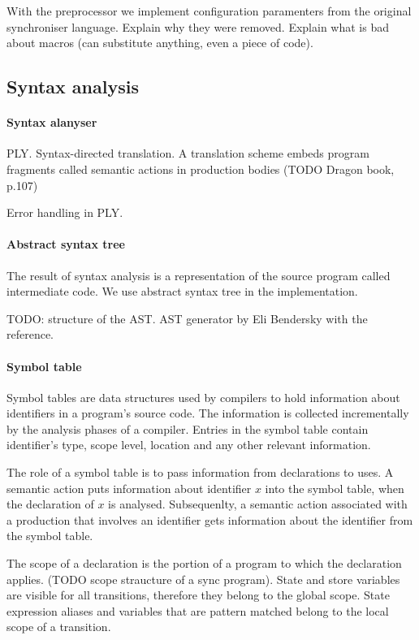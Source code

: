 With the preprocessor we implement configuration paramenters from the original synchroniser language. Explain why they were removed. Explain what is bad about macros (can substitute anything, even a piece of code).

\subsection{Syntax analysis}
  \paragraph{Syntax alanyser} PLY. Syntax-directed translation. A translation scheme embeds program fragments called semantic actions in production bodies (TODO Dragon book, p.107)

Error handling in PLY.


  \paragraph{Abstract syntax tree} The result of syntax analysis is a representation of the source program called intermediate code. We use abstract syntax tree in the implementation.

TODO: structure of the AST.
AST generator by Eli Bendersky with the reference.

  \paragraph{Symbol table}
Symbol tables are data structures used by compilers to hold information about identifiers in a program's source code. The information is collected incrementally by the analysis phases of a compiler. Entries in the symbol table contain identifier's type, scope level, location and any other relevant information.

The role of a symbol table is to pass information from declarations to uses. A semantic action puts information about identifier $x$ into the symbol table, when the declaration of $x$ is analysed. Subsequenlty, a semantic action associated with a production that involves an identifier gets information about the identifier from the symbol table.

The scope of a declaration is the portion of a program to which the declaration applies. (TODO scope straucture of a sync program). State and store variables are visible for all transitions, therefore they belong to the global scope. State expression aliases and variables that are pattern matched belong to the local scope of a transition.

